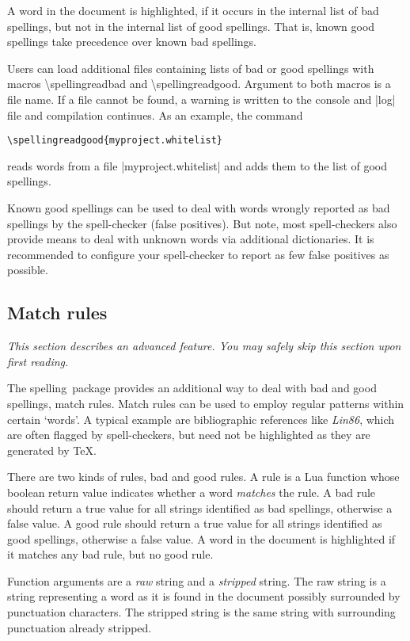 \documentclass[11pt]{article}
\newcommand*{\pkg}{\textsf{spelling}}
\newcommand*{\cmd}[1]{\mbox{\ttfamily\textbackslash#1}}
\newcommand*{\macro}[1]{\cmd{#1}\marginpar{\cmd{#1}}}
\begin{document}
A word in the document is highlighted, if it occurs in the internal list
of bad spellings, but not in the internal list of good spellings.  That
is, known good spellings take precedence over known bad spellings.

Users can load additional files containing lists of bad or good
spellings with macros \macro{spellingreadbad} and
\macro{spellingreadgood}.  Argument to both macros is a file name.  If a
file cannot be found, a warning is written to the console and |log| file
and compilation continues.  As an example, the command

\begin{lstlisting}[language={[LaTeX]TeX}]
\spellingreadgood{myproject.whitelist}
\end{lstlisting}
%
reads words from a file |myproject.whitelist| and adds them to the list
of good spellings.

Known good spellings can be used to deal with words wrongly reported as
bad spellings by the spell-checker (false positives).  But note, most
spell-checkers also provide means to deal with unknown words via
additional dictionaries.  It is recommended to configure your
spell-checker to report as few false positives as possible.


\subsection{Match rules}
\label{sec:matchrules}

\emph{This section describes an advanced feature.  You may safely skip
  this section upon first reading.}

The \pkg\ package provides an additional way to deal with bad and good
spellings, match rules.  Match rules can be used to employ regular
patterns within certain ‘words’.  A typical example are bibliographic
references like \emph{Lin86}, which are often flagged by spell-checkers,
but need not be highlighted as they are generated by \TeX.

There are two kinds of rules, bad and good rules.  A rule is a Lua
function whose boolean return value indicates whether a word
\emph{matches} the rule.  A bad rule should return a true value for all
strings identified as bad spellings, otherwise a false value.  A good
rule should return a true value for all strings identified as good
spellings, otherwise a false value.  A word in the document is
highlighted if it matches any bad rule, but no good rule.

Function arguments are a \emph{raw} string and a \emph{stripped} string.
The raw string is a string representing a word as it is found in the
document possibly surrounded by punctuation characters.  The stripped
string is the same string with surrounding punctuation already stripped.
\end{document}
